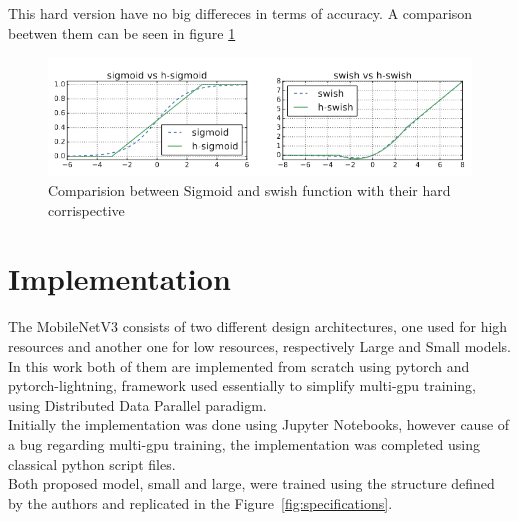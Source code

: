 \documentclass[12pt, letterpaper, twoside]{article}
\begin{document}
This hard version have no big differeces in terms of accuracy. A comparison beetwen them can be seen in figure \ref{fig:hswish_comparison}

\begin{figure}[H]
	\centering
	\includegraphics[width=1\textwidth]{hswish}
	\caption{Comparision between Sigmoid and swish function with their hard corrispective}
	\label{fig:hswish_comparison}
\end{figure}


\clearpage
\section{Implementation}
The MobileNetV3 consists of two different design architectures, one used for high resources and another one for low resources, respectively Large and Small models. In this work both of them are implemented from scratch using pytorch and pytorch-lightning, framework used essentially to simplify multi-gpu training, using Distributed Data Parallel paradigm. \\
Initially the implementation was done using Jupyter Notebooks, however cause of a bug regarding multi-gpu training, the implementation was completed using classical python script files. \\
Both proposed model, small and large, were trained using the structure defined by the authors and replicated in the Figure~\ref{fig:specifications}.
\end{document}
